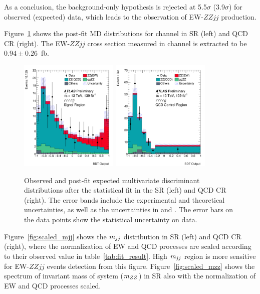 As a conclusion, the background-only hypothesis is rejected at 5.5$\sigma$ (3.9$\sigma$) for observed (expected) data,
which leads to the observation of EW-$ZZjj$ production.

Figure~\ref{fig:fit_MD} shows the post-fit MD distributions for \llll channel in SR (left) and QCD CR (right).
The EW-$ZZjj$ cross section measured in \llll channel is extracted to be $0.94 \pm 0.26$~fb.
\begin{figure}[!htbp]
\begin{center}
\includegraphics[width=0.42\textwidth]{figures/VBSZZ/fit/BDT_4l_SR_postFit.pdf}
\includegraphics[width=0.42\textwidth]{figures/VBSZZ/fit/BDT_4l_QCD_CR_postFit.pdf}
\end{center}
\caption{Observed and post-fit expected multivariate discriminant distributions after the statistical fit in the \llll SR (left) and QCD CR (right).
        The error bands include the experimental and theoretical uncertainties,
        as well as the uncertainties in \muEW and \muQCD.
        The error bars on the data points show the statistical uncertainty on data.
        }
\label{fig:fit_MD}
\end{figure}

Figure~\ref{fig:scaled_mjj} shows the $m_{jj}$ distribution in SR (left) and QCD CR (right),
where the normalization of EW and QCD processes are scaled according to their observed value in table~\ref{tab:fit_result}.
High $m_{jj}$ region is more sensitive for EW-$ZZjj$ events detection from this figure.
Figure~\ref{fig:scaled_mzz} shows the spectrum of invariant mass of \llll system ($m_{ZZ}$) in SR
also with the normalization of EW and QCD processes scaled.


